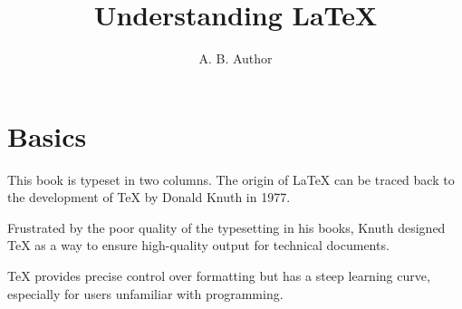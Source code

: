 \documentclass[12pt]{book}
\begin{document}
\title{Understanding LaTeX}
\author{A. B. Author}
\date{}

\maketitle

\chapter{Basics}
This book is                               typeset in two columns.
The origin of \LaTeX{} can be traced back to the development of \TeX{} by Donald Knuth in 1977. 

Frustrated by the poor quality of the typesetting in his books, Knuth designed \TeX{} as a way to ensure high-quality output for technical documents.\par \TeX{} provides precise control over formatting but has a steep learning curve, especially for users unfamiliar with programming.
\end{document}
